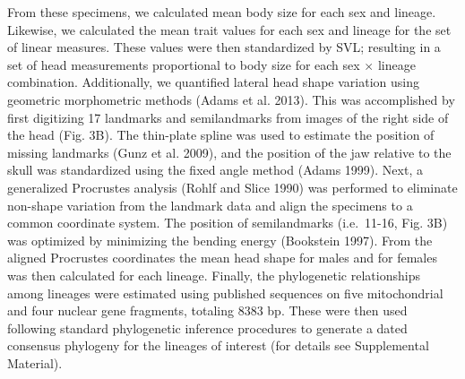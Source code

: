 \documentclass[]{article}
\begin{document}
From these specimens, we calculated mean body size for each sex and
lineage. Likewise, we calculated the mean trait values for each sex and
lineage for the set of linear measures. These values were then
standardized by SVL; resulting in a set of head measurements
proportional to body size for each sex \(\times\) lineage combination.
Additionally, we quantified lateral head shape variation using geometric
morphometric methods (Adams et al. 2013). This was accomplished by first
digitizing 17 landmarks and semilandmarks from images of the right side
of the head (Fig. 3B). The thin-plate spline was used to estimate the
position of missing landmarks (Gunz et al. 2009), and the position of
the jaw relative to the skull was standardized using the fixed angle
method (Adams 1999). Next, a generalized Procrustes analysis (Rohlf and
Slice 1990) was performed to eliminate non-shape variation from the
landmark data and align the specimens to a common coordinate system. The
position of semilandmarks (i.e.~11-16, Fig. 3B) was optimized by
minimizing the bending energy (Bookstein 1997). From the aligned
Procrustes coordinates the mean head shape for males and for females was
then calculated for each lineage. Finally, the phylogenetic
relationships among lineages were estimated using published sequences on
five mitochondrial and four nuclear gene fragments, totaling 8383 bp.
These were then used following standard phylogenetic inference
procedures to generate a dated consensus phylogeny for the lineages of
interest (for details see Supplemental Material). \hfill\break
\end{document}
